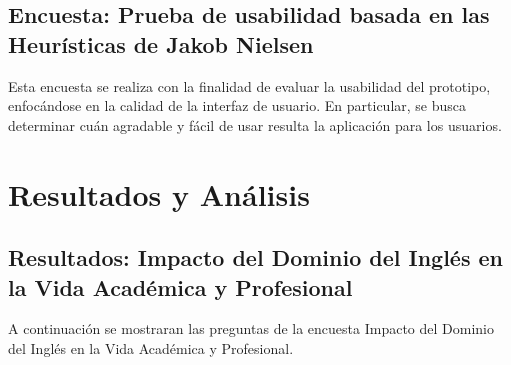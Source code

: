 \subsection{Encuesta: Prueba de usabilidad basada en las Heurísticas de Jakob Nielsen}

Esta encuesta se realiza con la finalidad de evaluar la usabilidad del prototipo, enfocándose en la calidad de la interfaz de usuario. En particular, se busca determinar cuán agradable y fácil de usar resulta la aplicación para los usuarios.

\section{Resultados y Análisis}

\subsection{Resultados: Impacto del Dominio del Inglés en la Vida Académica y Profesional}

A continuación se mostraran las preguntas de la encuesta Impacto del Dominio del Inglés en la Vida Académica y Profesional.

